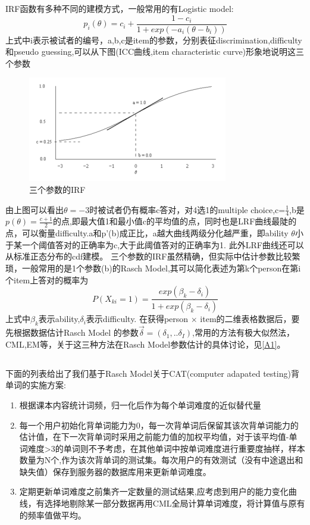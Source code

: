 \documentclass[12pt]{article}
\begin{document}
IRF函数有多种不同的建模方式，一般常用的有Logistic model:
\begin{equation}
p_i(\theta)=c_i+\frac{1-c_i}{1+exp(-a_i(\theta-b_i))}
\end{equation}
上式中i表示被试者的编号，a,b,c是item的参数，分别表征discrimination,difficulty和pseudo guessing,可以从下图(ICC曲线,item characteristic curve)形象地说明这三个参数
\begin{figure}
\caption{三个参数的IRF}
\includegraphics[width=\linewidth]{3PL_IRF.png}
\end{figure}
由上图可以看出$\theta=-3$时被试者仍有概率c答对，对4选1的multiple choice,c=$\frac{1}{4}$,b是$p(\theta)=\frac{c+1}{2}$的点,即最大值1和最小值c的平均值的点，同时也是LRF曲线最陡的点，可以衡量difficulty.a和p'(b)成正比，a越大曲线两级分化越严重，即ability $\theta$小于某一个阈值答对的正确率为c,大于此阈值答对的正确率为1.
此外LRF曲线还可以从标准正态分布的cdf建模。
三个参数的IRF虽然精确，但实际中估计参数比较繁琐，一般常用的是1个参数(b)的Rasch Model,其可以简化表述为第k个person在第i个item上答对的概率为
\begin{equation}\label{eq:Rasch}
P(X_{ki}=1)=\frac{exp(\beta_k-\delta_i)}{1+exp(\beta_k-\delta_i)}
\end{equation}
上式中$\beta_k$表示ability,$\delta_i$表示difficulty.
在获得person $\times$ item的二维表格数据后，要先根据数据估计Rasch Model 的参数$\vec{\delta}=(\delta_1,..\delta_I)$,常用的方法有极大似然法，CML,EM等，关于这三种方法在Rasch Model参数估计的具体讨论，见\ref{A1}。
\subsection{\textbf{}}
下面的列表给出了我们基于Rasch Model关于CAT(computer adapated testing)背单词的实施方案:
\begin{enumerate}
\item{根据课本内容统计词频，归一化后作为每个单词难度的近似替代量}
\item{每一个用户初始化背单词能力为0，每一次背单词后保留其该次背单词能力的估计值，在下一次背单词时采用之前能力值的加权平均值，对于该平均值-单词难度>3的单词则不予考虑，在其他单词中按单词难度进行重要度抽样，样本数量为N个,作为该次背单词的测试集。每次用户的有效测试（没有中途退出和缺失值）保存到服务器的数据库用来更新单词难度。}
\item{定期更新单词难度之前集齐一定数量的测试结果,应考虑到用户的能力变化曲线，有选择地剔除某一部分数据再用CML全局计算单词难度，将计算值与原有的频率值做平均。}
\end{enumerate}
\appendix
\end{document}
